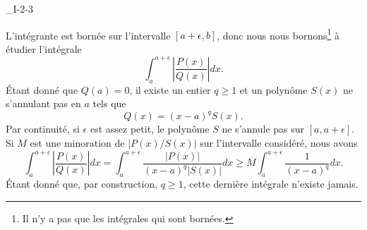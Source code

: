

\begin{corrige}{_I-2-3}

L'intégrante est bornée sur l'intervalle $[a+\epsilon,b]$, donc nous nous bornons\footnote{Il n'y a pas que les intégrales qui sont bornées.} à étudier l'intégrale
\begin{equation}
	\int_a^{a+\epsilon}\left| \frac{ P(x) }{ Q(x) }  \right|dx.
\end{equation}
Étant donné que $Q(a)=0$, il existe un entier $q\geq 1$ et un polynôme $S(x)$ ne s'annulant pas en $a$ tels que
\begin{equation}
	Q(x)=(x-a)^qS(x).
\end{equation}
Par continuité, si $\epsilon$ est assez petit, le polynôme $S$ ne s'annule pas sur $[a,a+\epsilon]$. Si $M$ est une minoration de $| P(x)/S(x) |$ sur l'intervalle considéré, nous avons
\begin{equation}
	\int_a^{a+\epsilon}\left| \frac{ P(x) }{ Q(x) }  \right|dx  
	=\int_a^{a+\epsilon} \frac{ |P(x)| }{ (x-a)^q | S(x) | }dx 
	\geq M\int_a^{a+\epsilon}\frac{1}{ (x-a)^q }dx.
\end{equation}
Étant donné que, par construction, $q\geq 1$, cette dernière intégrale n'existe jamais. 

\end{corrige}
